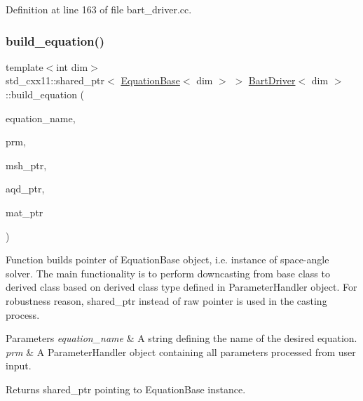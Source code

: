 Definition at line 163 of file bart\+\_\+driver.\+cc.

\mbox{\label{class_bart_driver_a10475395d7db9274b69349420460243d}} 
\subsubsection{\texorpdfstring{build\+\_\+equation()}{build\_equation()}}
{\footnotesize\ttfamily template$<$int dim$>$ \\
std\+\_\+cxx11\+::shared\+\_\+ptr$<$ \hyperlink{class_equation_base}{Equation\+Base}$<$ dim $>$ $>$ \hyperlink{class_bart_driver}{Bart\+Driver}$<$ dim $>$\+::build\+\_\+equation (\begin{DoxyParamCaption}\item[{std\+::string}]{equation\+\_\+name,  }\item[{const Parameter\+Handler \&}]{prm,  }\item[{const std\+\_\+cxx11\+::shared\+\_\+ptr$<$ \hyperlink{class_mesh_generator}{Mesh\+Generator}$<$ dim $>$ $>$}]{msh\+\_\+ptr,  }\item[{const std\+\_\+cxx11\+::shared\+\_\+ptr$<$ \hyperlink{class_a_q_base}{A\+Q\+Base}$<$ dim $>$ $>$}]{aqd\+\_\+ptr,  }\item[{const std\+\_\+cxx11\+::shared\+\_\+ptr$<$ \hyperlink{class_material_properties}{Material\+Properties} $>$}]{mat\+\_\+ptr }\end{DoxyParamCaption})\hspace{0.3cm}{\ttfamily [private]}}

Function builds pointer of Equation\+Base object, i.\+e. instance of space-\/angle solver. The main functionality is to perform downcasting from base class to derived class based on derived class type defined in Parameter\+Handler object. For robustness reason, shared\+\_\+ptr instead of raw pointer is used in the casting process.


\begin{DoxyParams}{Parameters}
{\em equation\+\_\+name} & A string defining the name of the desired equation. \\
\hline
{\em prm} & A Parameter\+Handler object containing all parameters processed from user input. \\
\hline
\end{DoxyParams}
\begin{DoxyReturn}{Returns}
shared\+\_\+ptr pointing to Equation\+Base instance. 
\end{DoxyReturn}


